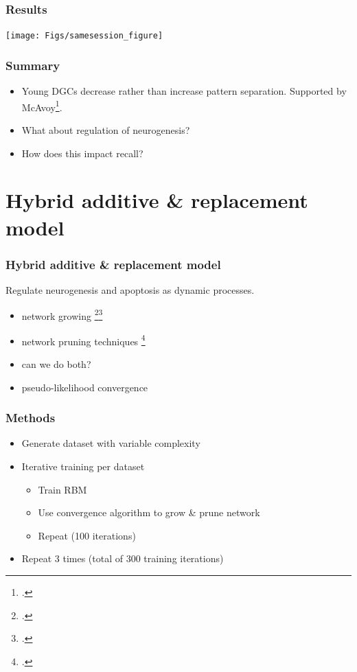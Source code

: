 \documentclass{beamer}
\begin{document}
\begin{frame}
\frametitle{Results}
\center
\texttt{[image: Figs/samesession\_figure]}
\end{frame}

\begin{frame}
\frametitle{Summary}
\begin{itemize}
\item Young DGCs decrease rather than increase pattern separation. Supported by McAvoy\footcite{mcavoy-et-al-15}.
\item What about regulation of neurogenesis?
\item How does this impact recall?
\end{itemize}
\end{frame}

\section{Hybrid additive \& replacement model}

\begin{frame}
\frametitle{Hybrid additive \& replacement model}
Regulate neurogenesis and apoptosis as dynamic processes.
\begin{itemize}
\item network growing \footcite{cascade-correlation}\footcite{DNC}
\item network pruning techniques \footcite{optimal-brain-damage} 
\item can we do both?
\item pseudo-likelihood convergence
\end{itemize}
\end{frame}

\begin{frame}
\frametitle{Methods}
\begin{itemize}
\item[] Generate dataset with variable complexity
\item[] Iterative training per dataset
	\begin{itemize}
	\item[1] Train RBM
	\item[2] Use convergence algorithm to grow \& prune network
	\item[3] Repeat (100 iterations)
	\end{itemize}
\item[] Repeat 3 times (total of 300 training iterations)
\end{itemize}
\end{frame}
\end{document}
